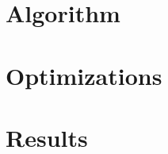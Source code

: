 


  \begin{frame}[plain]
  \titlepage
  \end{frame}
  \section{Algorithm}
  \setcounter{subsection}{1}
  
  \section{Optimizations}
  \setcounter{subsection}{1}
  
  \section{Results}
  \setcounter{subsection}{1}
  
